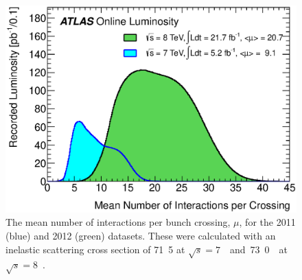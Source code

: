 \begin{figure}
	\includegraphics[width=\largefigwidth]{tex/experiment/pileup}
	\caption{The mean number of interactions per bunch crossing, $\mu$, for the 2011 (blue)
	and 2012 (green) datasets. These were calculated with an inelastic scattering cross 
	section of \unit{71.5}{\milli\barn} at \unit{$\sqrt{s} = 7$}{\TeV} and 
	\unit{73.0}{\milli\barn} at \unit{$\sqrt{s} = 8$}{\TeV}.}
	\label{fig:pileup}
\end{figure}

